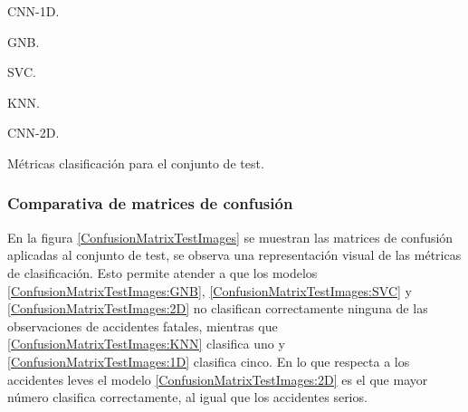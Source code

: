     \begin{table}[H]
        \scriptsize
        \renewcommand{\arraystretch}{1.1}

        \begin{subtable}{.5\textwidth}     
          \caption{CNN-1D.}
          \label{TestClassificationReport:CNN1D}
        \end{subtable}
        \hspace{1em}
        \begin{subtable}{.5\textwidth}
          \caption{GNB.}
          \label{TestClassificationReport:GNB}
        \end{subtable}
        \vspace*{0.5 cm}
        \begin{subtable}{.5\textwidth}     
          \centering
          \caption{SVC.}
          \label{TestClassificationReport:SVC}
        \end{subtable}
        \hspace{1em}
        \begin{subtable}{.5\textwidth}     
          \caption{KNN.}
          \label{TestClassificationReport:KNN}
        \end{subtable}
        \vspace*{0.5 cm}
        \begin{subtable}{1\textwidth}     
          \centering
          \caption{CNN-2D.}
          \label{TestClassificationReport:CNN2D}
        \end{subtable}

      \caption{Métricas clasificación para el conjunto de test.}
      \label{TestClassificationReport}
    \end{table}


  \subsubsection{Comparativa de matrices de confusión}

    En la figura \eqref{ConfusionMatrixTestImages} se muestran las matrices de confusión aplicadas al conjunto de test, se observa una representación visual de las métricas de clasificación. Esto permite atender a que los modelos  \eqref{ConfusionMatrixTestImages:GNB},  \eqref{ConfusionMatrixTestImages:SVC} y  \eqref{ConfusionMatrixTestImages:2D} no clasifican correctamente ninguna de las observaciones de accidentes fatales, mientras que  \eqref{ConfusionMatrixTestImages:KNN} clasifica uno y  \eqref{ConfusionMatrixTestImages:1D} clasifica cinco. En lo que respecta a los accidentes leves el modelo  \eqref{ConfusionMatrixTestImages:2D} es el que mayor número clasifica correctamente, al igual que los accidentes serios.

